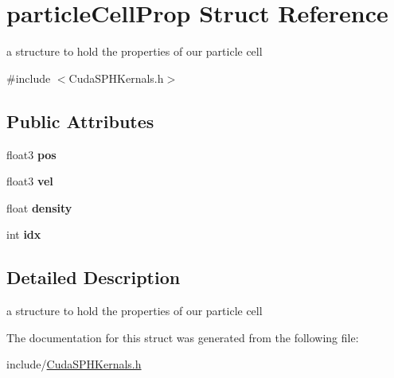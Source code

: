 \hypertarget{structparticle_cell_prop}{\section{particle\-Cell\-Prop Struct Reference}
\label{structparticle_cell_prop}
}


a structure to hold the properties of our particle cell  




{\ttfamily \#include $<$Cuda\-S\-P\-H\-Kernals.\-h$>$}

\subsection*{Public Attributes}
\begin{DoxyCompactItemize}
\item 
\hypertarget{structparticle_cell_prop_a016a16c8e3e05c845ff225c15737cf2e}{float3 {\bfseries pos}}\label{structparticle_cell_prop_a016a16c8e3e05c845ff225c15737cf2e}

\item 
\hypertarget{structparticle_cell_prop_a2a2e5a1e900a4ef5635a7967c0049df3}{float3 {\bfseries vel}}\label{structparticle_cell_prop_a2a2e5a1e900a4ef5635a7967c0049df3}

\item 
\hypertarget{structparticle_cell_prop_a27ad7b6527abe273b0e4eb1d91e9b71c}{float {\bfseries density}}\label{structparticle_cell_prop_a27ad7b6527abe273b0e4eb1d91e9b71c}

\item 
\hypertarget{structparticle_cell_prop_ac32e55524eadd3499ccb99c0d04ef557}{int {\bfseries idx}}\label{structparticle_cell_prop_ac32e55524eadd3499ccb99c0d04ef557}

\end{DoxyCompactItemize}


\subsection{Detailed Description}
a structure to hold the properties of our particle cell 

The documentation for this struct was generated from the following file\-:\begin{DoxyCompactItemize}
\item 
include/\hyperlink{_cuda_s_p_h_kernals_8h}{Cuda\-S\-P\-H\-Kernals.\-h}\end{DoxyCompactItemize}

